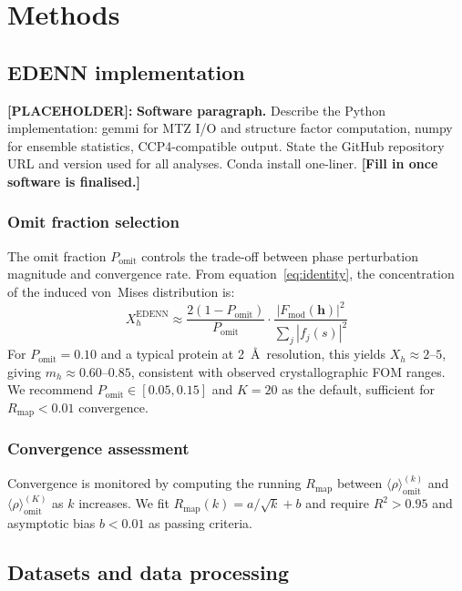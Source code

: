 \documentclass[10pt,twocolumn]{article}
\newcommand{\placeholder}[1]{%
  \begin{mdframed}[
    linecolor=placeholder,linewidth=1pt,
    backgroundcolor=red!5,
    innertopmargin=6pt,innerbottommargin=6pt,
    innerleftmargin=8pt,innerrightmargin=8pt]
  \small\color{placeholder}\textbf{[PLACEHOLDER]:} #1
  \end{mdframed}
}
\newcommand{\Fmod}{F_{\!\mathrm{mod}}}
\newcommand{\mh}{m_h}
\newcommand{\Xh}{X_h}
\newcommand{\rhoens}{\langle\rho\rangle_{\mathrm{omit}}}
\newcommand{\boldh}{\mathbf{h}}
\begin{document}
\section{Methods}

\subsection{EDENN implementation}

\placeholder{
\textbf{Software paragraph.}
Describe the Python implementation: gemmi for MTZ I/O and structure
factor computation, numpy for ensemble statistics, CCP4-compatible
output.
State the GitHub repository URL and version used for all analyses.
Conda install one-liner.
\textbf{[Fill in once software is finalised.]}
}

\subsubsection{Omit fraction selection}

The omit fraction $P_{\mathrm{omit}}$ controls the trade-off between
phase perturbation magnitude and convergence rate.
From equation~\eqref{eq:identity}, the concentration of the
induced von~Mises distribution is:
\begin{equation}
  \Xh^{\mathrm{EDENN}} \approx
  \frac{2(1-P_{\mathrm{omit}})}{P_{\mathrm{omit}}}
  \cdot \frac{|\Fmod(\boldh)|^2}{\sum_j |f_j(s)|^2}
  \label{eq:X_edenn}
\end{equation}
For $P_{\mathrm{omit}} = 0.10$ and a typical protein at 2~\AA\
resolution, this yields $\Xh \approx 2$--$5$, giving $\mh \approx
0.60$--$0.85$, consistent with observed crystallographic FOM ranges.
We recommend $P_{\mathrm{omit}} \in [0.05, 0.15]$ and $K = 20$ as
the default, sufficient for $R_{\mathrm{map}} < 0.01$ convergence.

\subsubsection{Convergence assessment}

Convergence is monitored by computing the running $R_{\mathrm{map}}$
between $\rhoens^{(k)}$ and $\rhoens^{(K)}$ as $k$ increases.
We fit $R_{\mathrm{map}}(k) = a/\sqrt{k} + b$ and require
$R^2 > 0.95$ and asymptotic bias $b < 0.01$ as passing criteria.

\subsection{Datasets and data processing}
\end{document}
